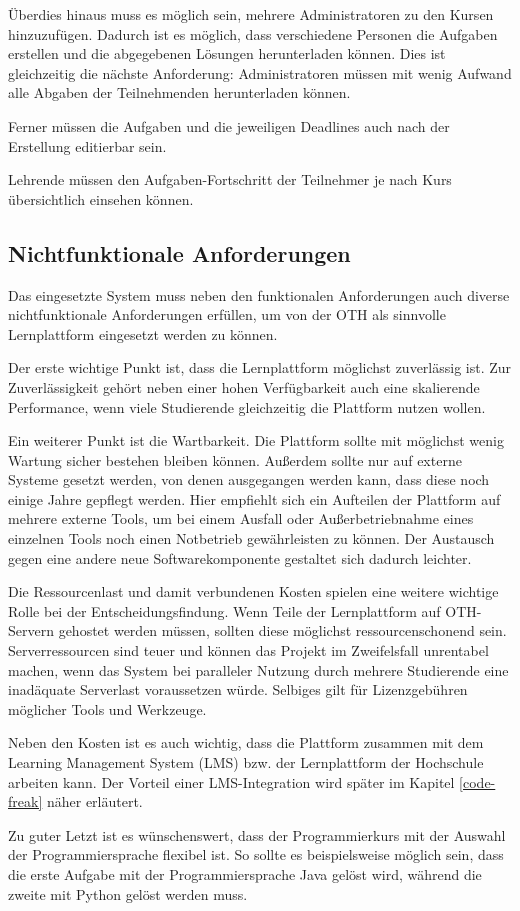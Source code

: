 Überdies hinaus muss es möglich sein, mehrere Administratoren zu den Kursen
hinzuzufügen. Dadurch ist es möglich, dass verschiedene Personen die Aufgaben
erstellen und die abgegebenen Lösungen herunterladen können. Dies ist
gleichzeitig die nächste Anforderung: Administratoren müssen mit wenig
Aufwand alle Abgaben der Teilnehmenden herunterladen können.

Ferner müssen die Aufgaben und die jeweiligen Deadlines auch nach der Erstellung
editierbar sein.

Lehrende müssen den Aufgaben-Fortschritt der Teilnehmer je nach Kurs 
übersichtlich einsehen können.
\subsection{Nichtfunktionale Anforderungen}
\label{anforderungsanalyse-nichtfunktional}
Das eingesetzte System muss neben den funktionalen Anforderungen auch diverse
nichtfunktionale Anforderungen erfüllen, um von der OTH als sinnvolle
Lernplattform eingesetzt werden zu können.

Der erste wichtige Punkt ist, dass die Lernplattform möglichst zuverlässig ist.
Zur Zuverlässigkeit gehört neben einer hohen Verfügbarkeit auch eine skalierende
Performance, wenn viele Studierende gleichzeitig die Plattform nutzen wollen.

Ein weiterer Punkt ist die Wartbarkeit. Die Plattform sollte mit möglichst wenig
Wartung sicher bestehen bleiben können. Außerdem sollte nur auf externe Systeme
gesetzt werden, von denen ausgegangen werden kann, dass diese noch einige Jahre
gepflegt werden. Hier empfiehlt sich ein Aufteilen der Plattform auf mehrere
externe Tools, um bei einem Ausfall oder Außerbetriebnahme eines einzelnen Tools
noch einen Notbetrieb gewährleisten zu können. Der Austausch gegen eine andere
neue Softwarekomponente gestaltet sich dadurch leichter.

Die Ressourcenlast und damit verbundenen Kosten spielen eine weitere wichtige
Rolle bei der Entscheidungsfindung. Wenn Teile der Lernplattform auf OTH-Servern
gehostet werden müssen, sollten diese möglichst ressourcenschonend sein.
Serverressourcen sind teuer und können das Projekt im Zweifelsfall unrentabel
machen, wenn das System bei paralleler Nutzung durch mehrere Studierende eine
inadäquate Serverlast voraussetzen würde. Selbiges gilt für Lizenzgebühren
möglicher Tools und Werkzeuge.

Neben den Kosten ist es auch wichtig, dass die Plattform zusammen mit dem
Learning Management System (LMS) bzw. der Lernplattform der Hochschule arbeiten
kann. Der Vorteil einer LMS-Integration wird später im Kapitel
\ref{code-freak} näher erläutert.

Zu guter Letzt ist es wünschenswert, dass der Programmierkurs mit der Auswahl
der Programmiersprache flexibel ist. So sollte es beispielsweise möglich sein,
dass die erste Aufgabe mit der Programmiersprache Java gelöst wird,
während die zweite mit Python gelöst werden muss.
